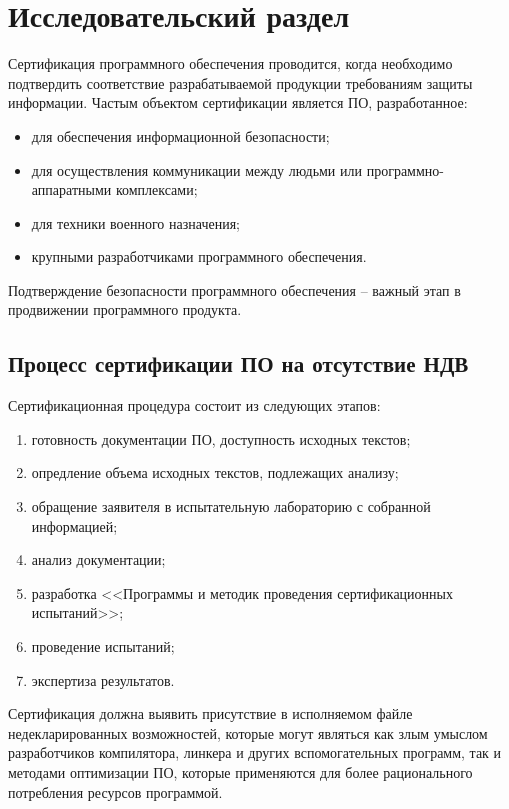 \chapter{Исследовательский раздел}\label{ch:ch1}
Сертификация программного обеспечения проводится, 
когда необходимо подтвердить соответствие разрабатываемой 
продукции требованиям защиты информации.
Частым объектом сертификации является ПО, разработанное:
\begin{itemize}
    \item для обеспечения информационной безопасности;
    \item для осуществления коммуникации между людьми или программно-аппаратными комплексами;
    \item для техники военного назначения;
    \item крупными разработчиками программного обеспечения.
\end{itemize}

Подтверждение безопасности программного обеспечения -- важный этап 
в продвижении программного продукта.

\section{Процесс сертификации ПО на отсутствие НДВ}\label{sec:ch1/sec1}
Сертификационная процедура состоит из следующих этапов:
\begin{enumerate}[label={\arabic*)}]
    \item готовность документации ПО, доступность исходных текстов;
    \item опредление объема исходных текстов, подлежащих анализу;
    \item обращение заявителя в испытательную лабораторию с собранной информацией;
    \item анализ документации;
    \item разработка <<Программы и методик проведения сертификационных испытаний>>;
    \item проведение испытаний;
    \item экспертиза результатов.
\end{enumerate}

Сертификация должна выявить присутствие в исполняемом файле недекларированных возможностей,
которые могут являться как злым умыслом разработчиков компилятора,
линкера и других вспомогательных программ, так и методами оптимизации ПО,
которые применяются для более рационального 
потребления ресурсов программой.

